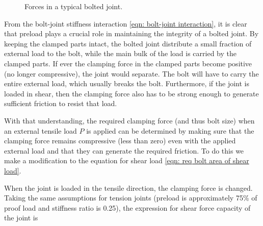 \documentclass[
10pt,
a4paper,
openany,
svgnames,
]{book}
\begin{document}
\begin{figure}[h]
  \centering
  \caption{Forces in a typical bolted joint.}
\end{figure}

From the bolt-joint stiffness interaction \cref{eqn: bolt-joint interaction}, it is clear that preload plays a crucial role in maintaining the integrity of a bolted joint. By keeping the clamped parts intact, the bolted joint distribute a small fraction of external load to the bolt, while the main bulk of the load is carried by the clamped parts. If ever the clamping force in the clamped parts become positive (no longer compressive), the joint would separate. The bolt will have to carry the entire external load, which usually breaks the bolt. Furthermore, if the joint is loaded in shear, then the clamping force also has to be strong enough to generate sufficient friction to resist that load.

With that understanding, the required clamping force (and thus bolt size) when an external tensile load $P$ is applied can be determined by making sure that the clamping force remains compressive (less than zero) even with the applied external load and that they can generate the required friction. To do this we make a modification to the equation for shear load \cref{eqn: req bolt area of shear load}. 

When the joint is loaded in the tensile direction, the clamping force is changed. Taking the same assumptions for tension joints (preload is approximately 75\% of proof load and stiffness ratio is 0.25), the expression for shear force capacity of the joint is 
 
\end{document}
